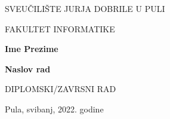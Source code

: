 \begin{center}
SVEUČILIŠTE JURJA DOBRILE U PULI 

FAKULTET INFORMATIKE

\vspace{45mm} 

\textbf{Ime Prezime}

\vspace{20mm} 

\textbf{Naslov rad}

\vspace{5mm}
DIPLOMSKI/ZAVRSNI RAD

\vfill

Pula, svibanj, 2022. godine
\end{center}
